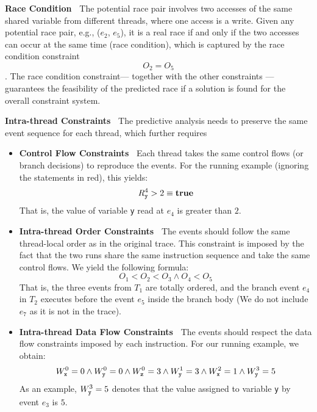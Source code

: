 {\bf Race Condition\ } The potential race pair involves two accesses of the same shared variable from different threads, where one access is a write. Given any potential race pair, e.g., ($e_2$, $e_5$), it is a real race if and only if the two accesses can occur at the same time (race condition), which is captured by the race condition constraint
$$
	O_2 = O_5
$$.
The race condition constraint--- together with the other constraints --- guarantees the feasibility of the predicted race if a solution is found for the overall constraint system.

{\bf Intra-thread Constraints\ } The predictive analysis needs to preserve the same event sequence for each thread, which further requires 

\begin{itemize}
\item {\bf Control Flow Constraints\ } Each thread takes the same control flows (or branch decisions) to reproduce the events.
 For the running example (ignoring the statements in red), this yields:
$$
	R_{\tt y}^4 > 2 \equiv {\bf true}
$$
That is, the value of variable {\tt y} read at $e_4$ is greater than $2$. 


\item {\bf Intra-thread Order Constraints\ } The events should follow the same thread-local order as in the original trace. This constraint is imposed by the fact that the two runs share the same instruction sequence and take the same control flows. 
We yield the following formula:
$$
	O_1 < O_2 < O_3 \wedge O_4 < O_5
$$
That is, the three events from $T_1$ are totally ordered, and the branch event $e_4$ in $T_2$ executes before the event $e_5$ inside the branch body (We do not include $e_7$ as it is not in the trace).

\item {\bf Intra-thread Data Flow Constraints\ } The events should respect the data flow constraints imposed by each instruction.
 For our running example, we obtain:
$$
	W_{\tt x}^0 = 0 \wedge W_{\tt y}^0 = 0 \wedge W_{\tt z}^0 = 3 \wedge W_{\tt y}^1 = 3 \wedge
			W_{\tt x}^2 = 1 \wedge W_{\tt y}^3 = 5
$$
As an example, $W_{\tt y}^3= 5$ denotes that the value assigned to variable {\tt y}  by event $e_3$ is $5$.
\end{itemize}



